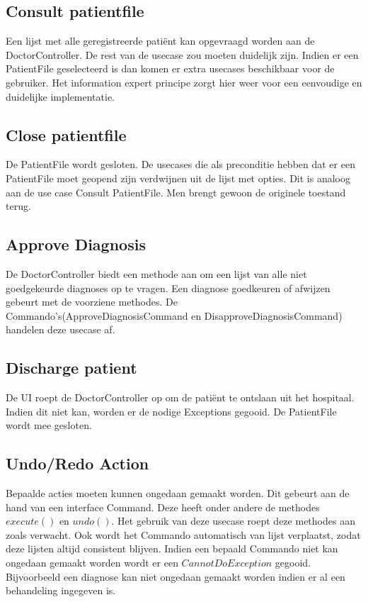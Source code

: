 \subsection{Consult patientfile}
Een lijst met alle geregistreerde patiënt kan opgevraagd worden aan de DoctorController. De rest van de usecase zou moeten duidelijk zijn.
Indien er een PatientFile geselecteerd is dan komen er extra usecases beschikbaar voor de gebruiker.
Het information expert principe zorgt hier weer voor een eenvoudige en duidelijke implementatie.

\subsection{Close patientfile}
De PatientFile wordt gesloten. De usecases die als preconditie hebben dat er een PatientFile moet geopend zijn verdwijnen uit de lijst met opties. 
Dit is analoog aan de use case Consult PatientFile. 
Men brengt gewoon de originele toestand terug.

\subsection{Approve Diagnosis}
De DoctorController biedt een methode aan om een lijst van alle niet goedgekeurde diagnoses op te vragen. 
Een diagnose goedkeuren of afwijzen gebeurt met de voorziene methodes. 
De Commando's(ApproveDiagnosisCommand en DisapproveDiagnosisCommand) handelen deze usecase af. 

\subsection{Discharge patient}
De UI roept de DoctorController op om de patiënt te ontslaan uit het hospitaal. 
Indien dit niet kan, worden er de nodige Exceptions gegooid.
De PatientFile wordt mee gesloten.

\subsection{Undo/Redo Action}
Bepaalde acties moeten kunnen ongedaan gemaakt worden. Dit gebeurt aan de hand van een interface Command. 
Deze heeft onder andere de methodes $execute()$ en $undo()$. 
Het gebruik van deze usecase roept deze methodes aan zoals verwacht. 
Ook wordt het Commando automatisch van lijst verplaatst, zodat deze lijsten altijd consistent blijven.
Indien een bepaald Commando niet kan ongedaan gemaakt worden wordt er een $CannotDoException$ gegooid. 
Bijvoorbeeld een diagnose kan niet ongedaan gemaakt worden indien er al een behandeling ingegeven is.

